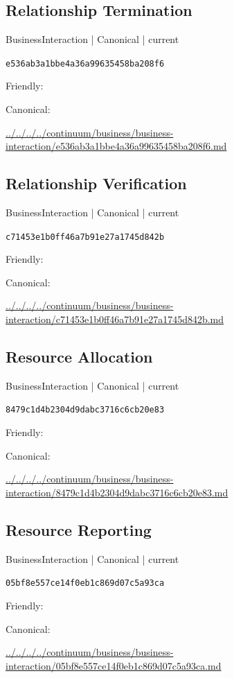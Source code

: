 \documentclass[10pt,a4paper]{article}
\begin{document}
\subsection*{Relationship Termination}
{\small BusinessInteraction | Canonical | current}\par
\texttt{e536ab3a1bbe4a36a99635458ba208f6}\par
Friendly: \par
Canonical: \par
{\footnotesize\url{../../../../continuum/business/business-interaction/e536ab3a1bbe4a36a99635458ba208f6.md}}\par
\subsection*{Relationship Verification}
{\small BusinessInteraction | Canonical | current}\par
\texttt{c71453e1b0ff46a7b91e27a1745d842b}\par
Friendly: \par
Canonical: \par
{\footnotesize\url{../../../../continuum/business/business-interaction/c71453e1b0ff46a7b91e27a1745d842b.md}}\par
\subsection*{Resource Allocation}
{\small BusinessInteraction | Canonical | current}\par
\texttt{8479c1d4b2304d9dabc3716c6cb20e83}\par
Friendly: \par
Canonical: \par
{\footnotesize\url{../../../../continuum/business/business-interaction/8479c1d4b2304d9dabc3716c6cb20e83.md}}\par
\subsection*{Resource Reporting}
{\small BusinessInteraction | Canonical | current}\par
\texttt{05bf8e557ce14f0eb1c869d07c5a93ca}\par
Friendly: \par
Canonical: \par
{\footnotesize\url{../../../../continuum/business/business-interaction/05bf8e557ce14f0eb1c869d07c5a93ca.md}}\par
\end{document}
